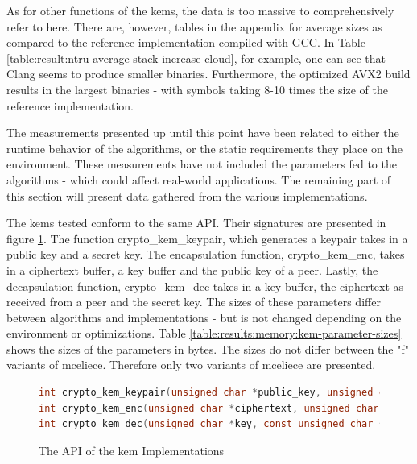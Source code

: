As for other functions of the \glspl{kem}, the data is too massive to comprehensively refer to here. There are, however, tables in the appendix for average sizes as compared to the reference implementation compiled with GCC. In Table \ref{table:result:ntru-average-stack-increase-cloud}, for example, one can see that Clang seems to produce smaller binaries. Furthermore, the optimized AVX2 build results in the largest binaries - with symbols taking 8-10 times the size of the reference implementation.


The measurements presented up until this point have been related to either the runtime behavior of the algorithms, or the static requirements they place on the environment. These measurements have not included the parameters fed to the algorithms - which could affect real-world applications. The remaining part of this section will present data gathered from the various implementations.

The \glspl{kem} tested conform to the same API. Their signatures are presented in figure \ref{figure:result:memory:kem-api}. The function crypto\_kem\_keypair, which generates a keypair takes in a public key and a secret key. The encapsulation function, crypto\_kem\_enc, takes in a ciphertext buffer, a key buffer and the public key of a peer. Lastly, the decapsulation function, crypto\_kem\_dec takes in a key buffer, the ciphertext as received from a peer and the secret key. The sizes of these parameters differ between algorithms and implementations - but is not changed depending on the environment or optimizations. Table \ref{table:results:memory:kem-parameter-sizes} shows the sizes of the parameters in bytes. The sizes do not differ between the "f" variants of \gls{mceliece}. Therefore only two variants of \gls{mceliece} are presented.

\begin{figure}
    \centering
    \begin{lstlisting}[language=C]
int crypto_kem_keypair(unsigned char *public_key, unsigned char *private_key);
int crypto_kem_enc(unsigned char *ciphertext, unsigned char *key, const unsigned char *public_key);
int crypto_kem_dec(unsigned char *key, const unsigned char *ciphertext, const unsigned char *private_key);
    \end{lstlisting}
    \caption{The API of the \gls{kem} Implementations}
    \label{figure:result:memory:kem-api}
\end{figure}

